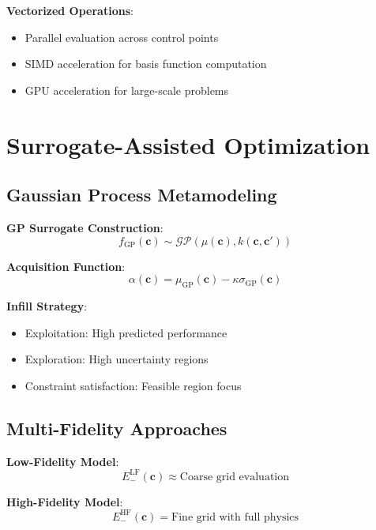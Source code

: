 \documentclass[11pt,a4paper]{article}
\begin{document}
\textbf{Vectorized Operations}:
\begin{itemize}
\item Parallel evaluation across control points
\item SIMD acceleration for basis function computation
\item GPU acceleration for large-scale problems
\end{itemize}

\section{Surrogate-Assisted Optimization}

\subsection{Gaussian Process Metamodeling}

\textbf{GP Surrogate Construction}:
\begin{equation}
f_{\text{GP}}(\mathbf{c}) \sim \mathcal{GP}(\mu(\mathbf{c}), k(\mathbf{c}, \mathbf{c}'))
\end{equation}

\textbf{Acquisition Function}:
\begin{equation}
\alpha(\mathbf{c}) = \mu_{\text{GP}}(\mathbf{c}) - \kappa \sigma_{\text{GP}}(\mathbf{c})
\end{equation}

\textbf{Infill Strategy}:
\begin{itemize}
\item Exploitation: High predicted performance
\item Exploration: High uncertainty regions
\item Constraint satisfaction: Feasible region focus
\end{itemize}

\subsection{Multi-Fidelity Approaches}

\textbf{Low-Fidelity Model}:
\begin{equation}
E_-^{\text{LF}}(\mathbf{c}) \approx \text{Coarse grid evaluation}
\end{equation}

\textbf{High-Fidelity Model}:
\begin{equation}
E_-^{\text{HF}}(\mathbf{c}) = \text{Fine grid with full physics}
\end{equation}
\end{document}
